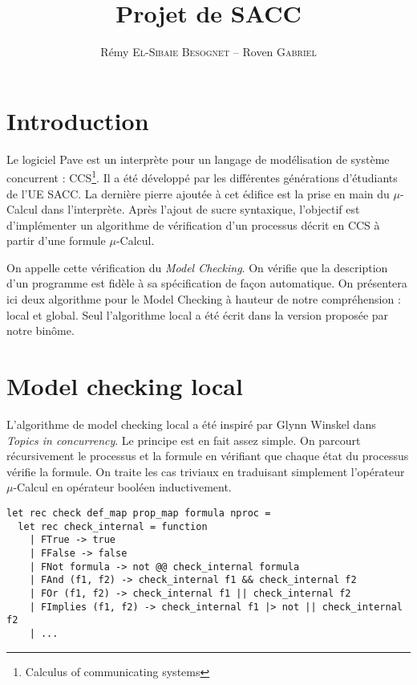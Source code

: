 \documentclass[a4paper]{article}
\title{Projet de SACC}
\author{Rémy \textsc{El-Sibaie Besognet} -- Roven \textsc{Gabriel}}
\begin{document}
\maketitle

\section{Introduction}

Le logiciel Pave est un interprète pour un langage de modélisation de
système concurrent : CCS\footnote{Calculus of communicating
systems}. Il a été développé par les différentes générations
d'étudiants de l'UE SACC. La dernière pierre ajoutée à cet édifice est
la prise en main du $\mu$-Calcul dans l'interprète. Après l'ajout de
sucre syntaxique, l'objectif est d'implémenter un algorithme de
vérification d'un processus décrit en CCS à partir d'une formule
$\mu$-Calcul.

On appelle cette vérification du \emph{Model Checking}. On vérifie
que la description d'un programme est fidèle à sa spécification de
façon automatique. On présentera ici deux algorithme pour le
Model Checking
à hauteur de notre compréhension : local et global. Seul
l'algorithme local a été écrit dans la version proposée par notre binôme.


\section{Model checking local}

L'algorithme de model checking local a été inspiré par Glynn Winskel
dans \emph{Topics in concurrency}. Le principe est en fait assez
simple. On parcourt récursivement le processus et la formule en
vérifiant que chaque état du processus vérifie la formule. On traite
les cas triviaux en traduisant simplement l'opérateur $\mu$-Calcul en
opérateur booléen inductivement.

\begin{lstlisting}[language=caml]
let rec check def_map prop_map formula nproc =
  let rec check_internal = function
    | FTrue -> true
    | FFalse -> false
    | FNot formula -> not @@ check_internal formula
    | FAnd (f1, f2) -> check_internal f1 && check_internal f2
    | FOr (f1, f2) -> check_internal f1 || check_internal f2
    | FImplies (f1, f2) -> check_internal f1 |> not || check_internal f2
    | ...
\end{lstlisting}
\end{document}
